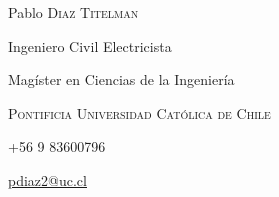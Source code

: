 \documentclass[a4paper,10pt]{article}
\begin{document}
\newcommand{\PUC}{\textsc{Pontificia Universidad Católica de Chile}}

\pagestyle{empty} %
\par{\centering
		{\Huge{Pablo \textsc{Diaz Titelman}}
	}\par
	}
\begin{center}
Ingeniero Civil Electricista

Magíster en Ciencias de la Ingeniería

\PUC

+56 9 83600796

\href{mailto:pdiaz2@uc.cl}{\underline{pdiaz2@uc.cl}}
\end{center}

\end{document}
